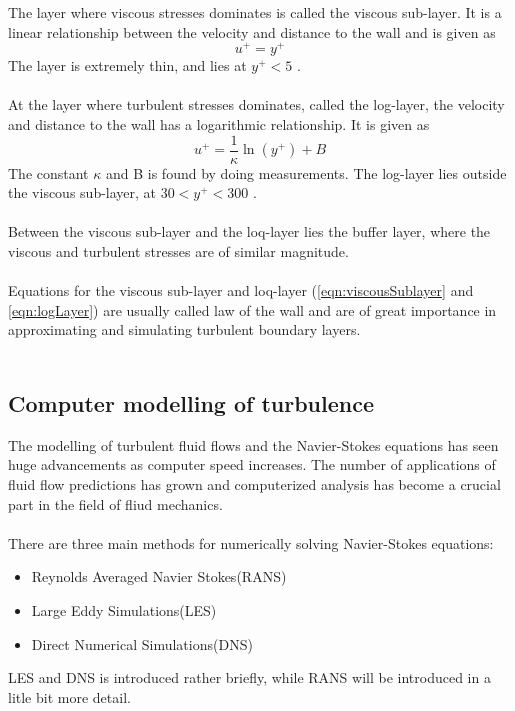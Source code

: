\documentclass[a4paper, 12pt]{report}
\begin{document}
The layer where viscous stresses dominates is called the viscous sub-layer. It is a linear relationship between the velocity and distance to the wall and is given as \cite{CFD}
\begin{equation}
u^+ = y^+
\label{eqn:viscousSublayer}
\end{equation}
The layer is extremely thin, and lies at $y^+ < 5$ \cite{CFD}.\\
\\ 
At the layer where turbulent stresses dominates, called the log-layer, the velocity and distance to the wall has a logarithmic relationship. It is given as \cite{CFD}
\begin{equation}
u^+ = \frac{1}{\kappa}\ln(y^+) + B
\label{eqn:logLayer}
\end{equation}
The constant $\kappa$ and B is found by doing measurements. The log-layer lies outside the viscous sub-layer, at $30 < y^+ < 300$ \cite{CDF}.\\
\\
Between the viscous sub-layer and the loq-layer lies the buffer layer, where the viscous and turbulent stresses are of similar magnitude.\\
\\
Equations for the viscous sub-layer and loq-layer (\ref{eqn:viscousSublayer} and  \ref{eqn:logLayer}) are usually called law of the wall and are of great importance in approximating and simulating turbulent boundary layers.\\
\\
 
\subsection{Computer modelling of turbulence}
The modelling of turbulent fluid flows and the Navier-Stokes equations has seen huge advancements as computer speed increases. The number of applications of fluid flow predictions has grown and computerized analysis has become a crucial part in the field of fliud mechanics.\\
\\
There are three main methods for numerically solving Navier-Stokes equations:
\begin{itemize}
	\item Reynolds Averaged Navier Stokes(RANS)
	\item  Large Eddy Simulations(LES)
	\item  Direct Numerical Simulations(DNS)
\end{itemize}
LES and DNS is introduced rather briefly, while RANS will be introduced in a litle bit more detail.
\end{document}
